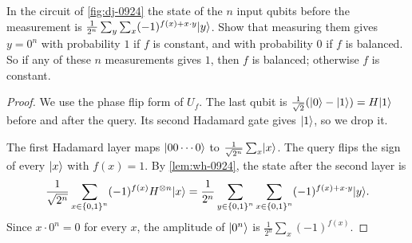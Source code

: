 \FloatBarrier
{} %
\begin{exercisebox}
\begin{exercise}\label{ex:dj-0924}\label{thm:dj-0924}
    In the circuit of \cref{fig:dj-0924} the state of the $n$ input qubits before the measurement
    is $\frac{1}{2^n} \sum_{y} \sum_{x} (-1)^{f(x) + x \cdot y} \lvert y \rangle$. Show that measuring them
    gives $y = 0^n$ with probability $1$ if $f$ is constant, and with probability $0$ if $f$ is
    balanced. So if any of these $n$ measurements gives $1$, then $f$ is balanced; otherwise $f$ is
    constant.
\end{exercise}
\tcblower
\begin{proof}
    We use the phase flip form of $U_f$. The last qubit is
    $\frac{1}{\sqrt{2}}(\lvert 0 \rangle - \lvert 1 \rangle) = H\lvert 1 \rangle$ before and after the query. Its second
    Hadamard gate gives $\lvert 1 \rangle$, so we drop it.

    The first Hadamard layer maps $\lvert 00 \cdots 0 \rangle$ to $\frac{1}{\sqrt{2^n}} \sum_{x} \lvert x \rangle$.
    The query flips the sign of every $\lvert x \rangle$ with $f(x) = 1$. By \cref{lem:wh-0924}, the state
    after the second layer is
    \[\frac{1}{\sqrt{2^n}} \sum_{x \in \left\lbrace0,1\right\rbrace^n} (-1)^{f(x)} H^{\otimes n} \lvert x \rangle
        = \frac{1}{2^n} \sum_{y \in \left\lbrace0,1\right\rbrace^n} \sum_{x \in \left\lbrace0,1\right\rbrace^n} (-1)^{f(x) + x \cdot y} \lvert y \rangle.\]
    Since $x \cdot 0^n = 0$ for every $x$, the amplitude of $\lvert 0^n \rangle$ is
    $\frac{1}{2^n} \sum_{x} (-1)^{f(x)}$.


\end{proof}
\end{exercisebox}
